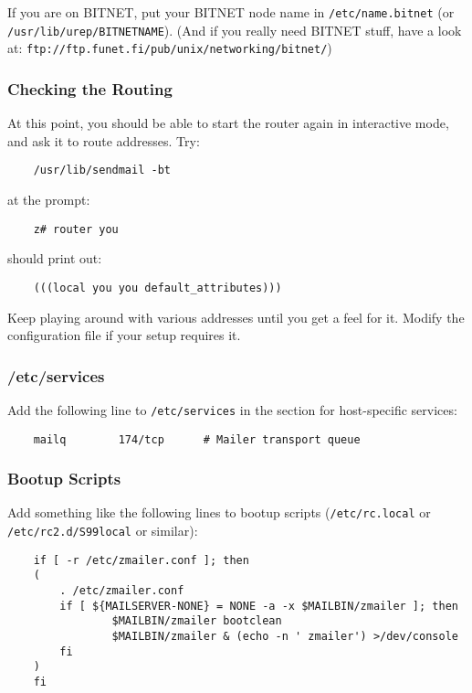 If you are on BITNET, put your BITNET node name in {\tt /etc/name.bitnet}
(or {\tt /usr/lib/urep/BITNETNAME}). (And if you really need BITNET stuff, have a look at:
{\tt ftp://ftp.funet.fi/pub/unix/networking/bitnet/})




\subsubsection{Checking the Routing}

At this point, you should be able to start the router again in
interactive mode, and ask it to route addresses.  Try:
\begin{verbatim}
    /usr/lib/sendmail -bt
\end{verbatim}

at the prompt:
\begin{verbatim}
    z# router you
\end{verbatim}

should print out:
\begin{verbatim}
    (((local you you default_attributes)))
\end{verbatim}


Keep playing around with various addresses until you get a feel for it.
Modify the configuration file if your setup requires it.


\subsubsection{/etc/services}

Add the following line to {\tt /etc/services} in the section for
host-specific services:
\begin{verbatim}
    mailq        174/tcp      # Mailer transport queue
\end{verbatim}


\subsubsection{Bootup Scripts}

Add something like the following lines to bootup scripts ({\tt /etc/rc.local}
or {\tt /etc/rc2.d/S99local} or similar):
\begin{verbatim}
    if [ -r /etc/zmailer.conf ]; then
    (
        . /etc/zmailer.conf
        if [ ${MAILSERVER-NONE} = NONE -a -x $MAILBIN/zmailer ]; then
                $MAILBIN/zmailer bootclean
                $MAILBIN/zmailer & (echo -n ' zmailer') >/dev/console
        fi
    )
    fi
\end{verbatim}

